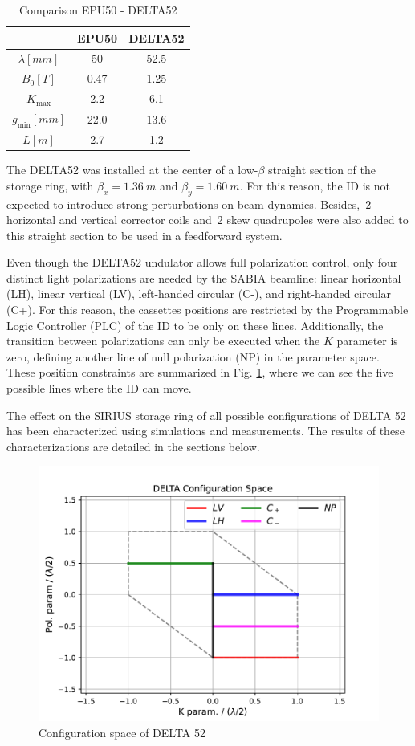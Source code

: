 \documentclass[a4paper,
               keeplastbox,   %
               ]{jacow}
\begin{document}
\begin{table}[h]
\centering
\caption{Comparison EPU50 - DELTA52}
\begin{tabular}{ccc}
\toprule
                      & EPU50 & DELTA52 \\ \midrule
$\lambda \unit{[mm]}$ & 50    & 52.5    \\ 
$B_{0} \unit{[T]}$    & 0.47  & 1.25    \\ 
$K_\text{max}$             & 2.2   & 6.1     \\ 
$g_\text{min} \unit{[mm]}$ & 22.0  & 13.6    \\ 
$L \unit{[m]}$        & 2.7   & 1.2     \\ \bottomrule
\end{tabular}
\label{table1}
\end{table}

The DELTA52 was installed at the center of a low-$\beta$ straight section of the storage ring, with $\beta_{x} = \SI{1.36}{m}$ and $\beta_{y} = \SI{1.60}{m}$. For this reason, the ID is not expected to introduce strong perturbations on beam dynamics. Besides,~\num{2} horizontal and vertical corrector coils and~\num{2} skew quadrupoles were also added to this straight section to be used in a feedforward system. 

Even though the DELTA52 undulator allows full polarization control, only four distinct light polarizations are needed by the SABIA beamline: linear horizontal (LH), linear vertical (LV), left-handed circular (C-), and right-handed circular (C+). For this reason, the cassettes positions are restricted by the Programmable Logic Controller (PLC) of the ID to be only on these lines. Additionally, the transition between polarizations can only be executed when the $K$ parameter is zero, defining another line of null polarization (NP) in the parameter space. These position constraints are summarized in Fig. \ref{fig:config_space}, where we can see the five possible lines where the ID can move.

The effect on the SIRIUS storage ring of all possible configurations of DELTA 52 has been characterized using simulations and measurements. The results of these characterizations are detailed in the sections below.

\begin{figure}[]
    \centering
   \includegraphics[width=.8\columnwidth]{config_space.pdf}
   \caption{Configuration space of DELTA 52}
   \label{fig:config_space}
\end{figure}
\end{document}
